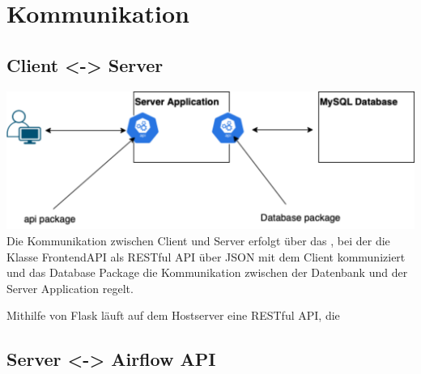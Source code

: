 \section{Kommunikation}

\subsection{Client <-> Server} 
\includegraphics[width=1\textwidth]{res/Kommunikation.png}
Die Kommunikation zwischen Client und Server erfolgt über das , bei der die Klasse FrontendAPI 
als RESTful API über JSON mit dem Client kommuniziert und das Database Package die Kommunikation 
zwischen der Datenbank und der Server Application regelt.

Mithilfe von Flask läuft auf dem Hostserver eine RESTful API, die 


\subsection{Server <-> Airflow API}

\newpage